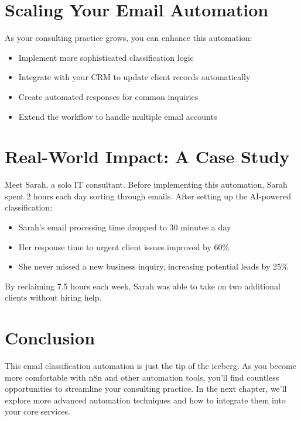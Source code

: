 \section{Scaling Your Email Automation}

As your consulting practice grows, you can enhance this automation:

\begin{itemize}
    \item Implement more sophisticated classification logic
    \item Integrate with your CRM to update client records automatically
    \item Create automated responses for common inquiries
    \item Extend the workflow to handle multiple email accounts
\end{itemize}

\section{Real-World Impact: A Case Study}

Meet Sarah, a solo IT consultant. Before implementing this automation, Sarah spent 2 hours each day sorting through emails. After setting up the AI-powered classification:

\begin{itemize}
    \item Sarah's email processing time dropped to 30 minutes a day
    \item Her response time to urgent client issues improved by 60\%
    \item She never missed a new business inquiry, increasing potential leads by 25\%
\end{itemize}

By reclaiming 7.5 hours each week, Sarah was able to take on two additional clients without hiring help.

\section{Conclusion}

This email classification automation is just the tip of the iceberg. As you become more comfortable with n8n and other automation tools, you'll find countless opportunities to streamline your consulting practice. In the next chapter, we'll explore more advanced automation techniques and how to integrate them into your core services.

